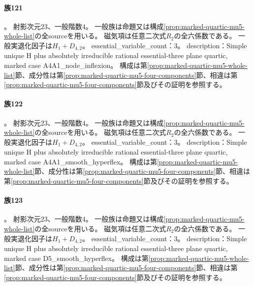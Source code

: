\paragraph{族121}\label{catalogue:R4_MARKED_QUARTIC_MU5_A4A1_NODE_INFLEXION_23}
。
射影次元$23$、一般階数$4$。
一般族は命題又は構成\ref{prop:marked-quartic-mu5-whole-list}の全sourceを用いる。
磁気項は任意二次式$R_2$の全六係数である。
一般実退化因子は$H_{1}+D_{4,2}$。
essential\_variable\_count：3。
description：Simple unique H plus absolutely irreducible rational essential-three plane quartic, marked case A4A1\_node\_inflexion。
構成は第\ref{prop:marked-quartic-mu5-whole-list}節、成分性は第\ref{prop:marked-quartic-mu5-four-components}節、相違は第\ref{prop:marked-quartic-mu5-four-components}節及びその証明を参照する。

\paragraph{族122}\label{catalogue:R4_MARKED_QUARTIC_MU5_A4A1_SMOOTH_HYPERFLEX_23}
。
射影次元$23$、一般階数$4$。
一般族は命題又は構成\ref{prop:marked-quartic-mu5-whole-list}の全sourceを用いる。
磁気項は任意二次式$R_2$の全六係数である。
一般実退化因子は$H_{1}+D_{4,2}$。
essential\_variable\_count：3。
description：Simple unique H plus absolutely irreducible rational essential-three plane quartic, marked case A4A1\_smooth\_hyperflex。
構成は第\ref{prop:marked-quartic-mu5-whole-list}節、成分性は第\ref{prop:marked-quartic-mu5-four-components}節、相違は第\ref{prop:marked-quartic-mu5-four-components}節及びその証明を参照する。

\paragraph{族123}\label{catalogue:R4_MARKED_QUARTIC_MU5_D5_SMOOTH_HYPERFLEX_23}
。
射影次元$23$、一般階数$4$。
一般族は命題又は構成\ref{prop:marked-quartic-mu5-whole-list}の全sourceを用いる。
磁気項は任意二次式$R_2$の全六係数である。
一般実退化因子は$H_{1}+D_{4,2}$。
essential\_variable\_count：3。
description：Simple unique H plus absolutely irreducible rational essential-three plane quartic, marked case D5\_smooth\_hyperflex。
構成は第\ref{prop:marked-quartic-mu5-whole-list}節、成分性は第\ref{prop:marked-quartic-mu5-four-components}節、相違は第\ref{prop:marked-quartic-mu5-four-components}節及びその証明を参照する。

